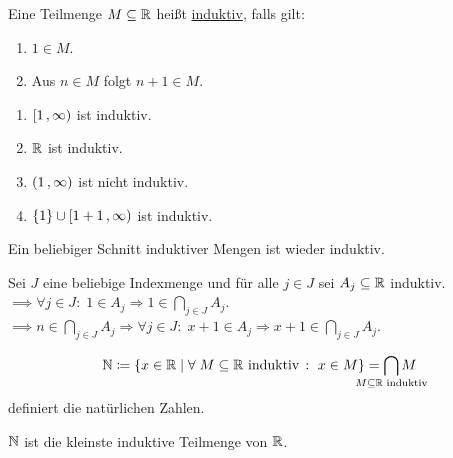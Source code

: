 \documentclass[../ana1.tex]{subfiles}
\begin{document}
\iftoggle{short}{}{\newpage}%

\begin{defi}
	Eine Teilmenge \(M \subseteq \mathbb{R}\) heißt \underline{induktiv}, falls gilt:
	\begin{enumerate}[label= (I\arabic*)]
		\item\label{ax:I1} \(1 \in M\).
		\item\label{ax:I2} Aus \(n \in M\) folgt \(n + 1 \in M\).
	\end{enumerate}
\end{defi}

\begin{bspe}\leavevmode
	\begin{enumerate}[(1)]
		\item \([1 \operatorname{,} \infty)\) ist induktiv.
		\item \(\mathbb{R}\) ist induktiv.
		\item \((1 \operatorname{,} \infty)\) ist nicht induktiv.
		\item \(\{1\} \cup [1+1 \operatorname{,} \infty)\) ist induktiv.
	\end{enumerate}
\end{bspe}

\begin{bem}
	Ein beliebiger Schnitt induktiver Mengen ist wieder induktiv.
\end{bem}
\begin{bew}
	Sei \(J\) eine beliebige Indexmenge und für alle \(j \in J\) sei \(A_{j} \subseteq \mathbb{R}\) induktiv.\\
	\(\implies \forall j \in J \colon \; 1 \in A_{j} \Rightarrow 1 \in \underset{j \in J}{\bigcap}A_{j}\).\\
	\(\implies n \in \underset{j \in J}{\bigcap}A_{j} \Rightarrow \forall j \in J \colon \; x + 1 \in A_{j} \Rightarrow x + 1 \in \underset{j \in J}{\bigcap}A_{j}\).
\end{bew}

\begin{defi}
	\[\N \coloneqq \set{x \in \R \; \vert \; \forall \; M \subseteq \R \text{ induktiv } \colon \; x \in M} = \smashoperator{\bigcap_{M \subseteq \R \text{ induktiv}}} M\]
	definiert die natürlichen Zahlen.
\end{defi}

\begin{bem}
	\(\mathbb{N}\) ist die kleinste induktive Teilmenge von \(\mathbb{R}\).
\end{bem}
\end{document}
